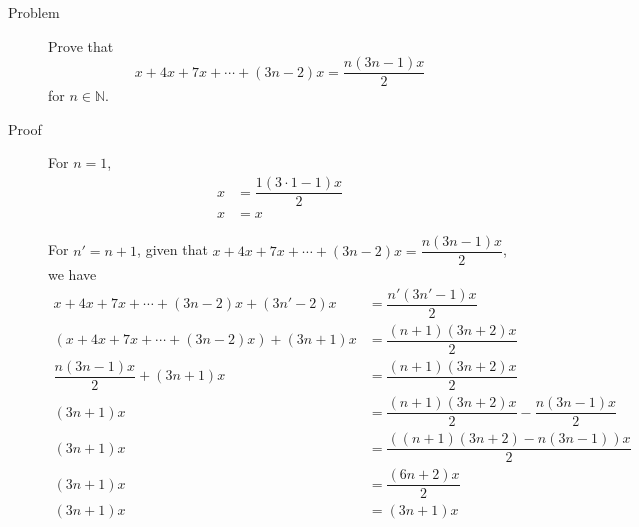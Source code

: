\begin{description}
\item[Problem] Prove that
$$x + 4x + 7x + \cdots + (3n - 2)x = \dfrac{n(3n-1)x}{2}$$
for $n \in \mathbb{N}$.

\item[Proof] For $n = 1$,
\begin{equation*}\begin{aligned}
x &= \dfrac{1(3 \cdot 1 - 1)x}{2} \\
x &= x
\end{aligned}\end{equation*}

For $n' = n + 1$, given that $x + 4x + 7x + \cdots + (3n - 2)x =
\dfrac{n(3n-1)x}{2}$, we have
\begin{equation*}\begin{aligned}
x + 4x + 7x + \cdots + (3n - 2)x + (3n' - 2)x &= \dfrac{n'(3n'-1)x}{2} \\
(x + 4x + 7x + \cdots + (3n - 2)x) + (3n+1)x &= \dfrac{(n+1)(3n+2)x}{2} \\
\dfrac{n(3n-1)x}{2} + (3n + 1)x &= \dfrac{(n+1)(3n+2)x}{2} \\
(3n + 1)x &= \dfrac{(n+1)(3n+2)x}{2} - \dfrac{n(3n-1)x}{2} \\
(3n + 1)x &= \dfrac{\left((n+1)(3n+2) - n(3n-1)\right)x}{2} \\
(3n + 1)x &= \dfrac{\left(6n + 2\right)x}{2} \\
(3n + 1)x &= (3n + 1)x \\
\end{aligned}\end{equation*}

\end{description}
